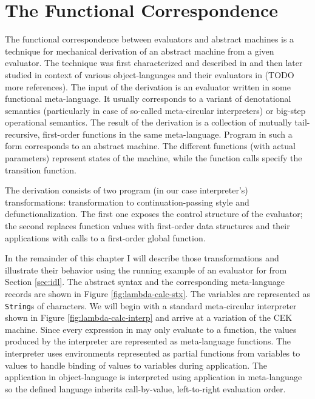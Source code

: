 \chapter{The Functional Correspondence}\label{chapter:functional-correspondence}
The functional correspondence between evaluators and abstract machines is a technique for mechanical derivation of an abstract machine from a given evaluator.
The technique was first characterized and described in \cite{functional-correspondence} and then later studied in context of various object-languages and their evaluators in (TODO more references).
The input of the derivation is an evaluator written in some functional meta-language.
It usually corresponds to a variant of denotational semantics (particularly in case of so-called meta-circular interpreters) or big-step operational semantics.
The result of the derivation is a collection of mutually tail-recursive, first-order functions in the same meta-language.
Program in such a form corresponds to an abstract machine.
The different functions (with actual parameters) represent states of the machine, while the function calls specify the transition function.

The derivation consists of two program (in our case interpreter's) transformations: transformation to continuation-passing style and defunctionalization.
The first one exposes the control structure of the evaluator; the second replaces function values with first-order data structures and their applications with calls to a first-order global function.

In the remainder of this chapter I will describe those transformations and illustrate their behavior using the running example of an evaluator for \LC{} from Section \ref{sec:idl}.
The abstract syntax and the corresponding meta-language records are shown in Figure \ref{fig:lambda-calc-stx}.
The variables are represented as \lstinline!String!s of characters.
We will begin with a standard meta-circular interpreter shown in Figure \ref{fig:lambda-calc-interp} and arrive at a variation of the CEK machine.
Since every expression in \LC{} may only evaluate to a function, the values produced by the interpreter are represented as meta-language functions.
The interpreter uses environments represented as partial functions from variables to values to handle binding of values to variables during application.
The application in object-language is interpreted using application in meta-language so the defined language inherits call-by-value, left-to-right evaluation order.

